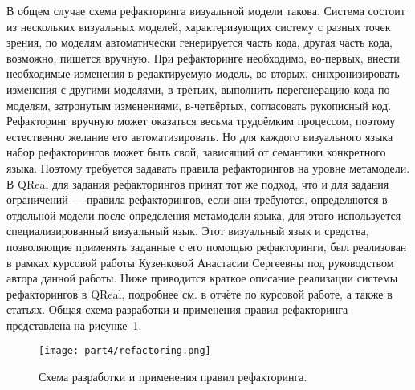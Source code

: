 В общем случае схема рефакторинга визуальной модели такова. Система состоит из нескольких 
визуальных моделей, характеризующих систему с разных точек зрения, по моделям автоматически 
генерируется часть кода, другая часть кода, возможно, пишется вручную. При рефакторинге 
необходимо, во-первых, внести необходимые изменения в редактируемую модель, во-вторых, 
синхронизировать изменения с другими моделями, в-третьих, выполнить перегенерацию кода 
по моделям, затронутым изменениями, в-четвёртых, согласовать рукописный код. Рефакторинг 
вручную может оказаться весьма трудоёмким процессом, поэтому естественно желание его 
автоматизировать. Но для каждого визуального языка набор рефакторингов может быть свой, 
зависящий от семантики конкретного языка. Поэтому требуется задавать правила рефакторингов 
на уровне метамодели. В QReal для задания рефакторингов принят тот же подход, что и 
для задания ограничений --- правила рефакторингов, если они требуются, определяются 
в отдельной модели после определения метамодели языка, для этого используется специализированный 
визуальный язык. Этот визуальный язык и средства, позволяющие применять заданные с его 
помощью рефакторинги, был реализован в рамках курсовой работы Кузенковой Анастасии Сергеевны 
под руководством автора данной работы. Ниже приводится краткое описание реализации 
системы рефакторингов в QReal, подробнее см. в отчёте по курсовой работе, а также в 
статьях. Общая схема разработки и применения правил рефакторинга представлена на рисунке~\ref{image:refactoring}.

\begin{figure} [ht]
	\begin{center}
		\texttt{[image: part4/refactoring.png]}
		\caption{Схема разработки и применения правил рефакторинга.}
		\label{image:refactoring}
	\end{center}
\end{figure}

